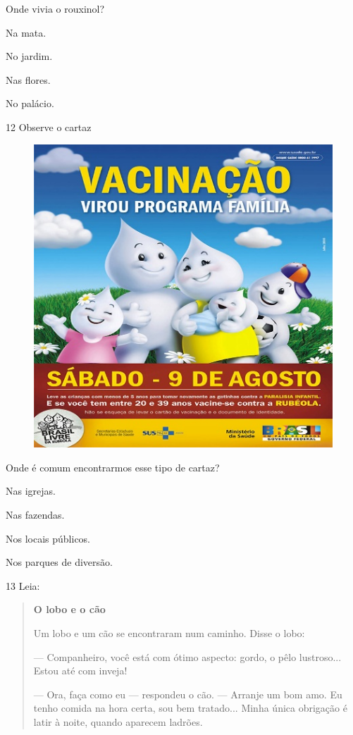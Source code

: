 
Onde vivia o rouxinol?

\begin{escolha}
\item Na mata.

\item No jardim.

\item Nas flores.

\item No palácio.
\end{escolha}


\num{12} Observe o cartaz

\begin{figure}[htpb!]
\centering
\includegraphics[width=.5\textwidth]{media/image159.jpeg}
\end{figure}

Onde é comum encontrarmos esse tipo de cartaz?

\begin{escolha}
\item Nas igrejas.

\item Nas fazendas.

\item Nos locais públicos.

\item Nos parques de diversão.
\end{escolha}

\num{13} Leia:


\begin{quote}
\textbf{O lobo e o cão}

Um lobo e um cão se encontraram num caminho. Disse o lobo:

--- Companheiro, você está com ótimo aspecto: gordo, o pêlo lustroso...
Estou até com inveja!

--- Ora, faça como eu --- respondeu o cão. --- Arranje um bom amo.
Eu tenho comida na hora certa, sou bem tratado...
Minha única obrigação é latir à noite, quando aparecem ladrões.
\end{quote}

